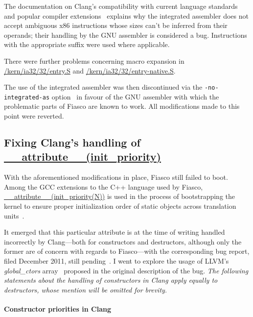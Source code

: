 The documentation on Clang's compatibility with current language standards and
popular compiler extensions~\cite[Inline assembly]{clang-compatibility}
explains why the integrated assembler does not accept ambiguous x86
instructions whose sizes can't be inferred from their operands; their handling
by the GNU assembler is considered a bug. Instructions with the appropriate
suffix were used where applicable.

There were further problems concerning macro expansion in
\url{/kern/ia32/32/entry.S} and \url{/kern/ia32/32/entry-native.S}.

The use of the integrated assembler was then discontinued via the
\texttt{-no-integrated-as} option~\cite{manclang} in favour of the GNU
assembler with which the problematic parts of Fiasco are known to work.
All modifications made to this point were reverted.

\subsection{Fixing Clang's handling of \url{\_\_attribute\_\_(init\_priority)}}

With the aforementioned modifications in place, Fiasco still failed to boot. Among the GCC extensions
to the C++ language used by Fiasco,
\url{\_\_attribute\_\_(init\_priority(N))} is used
in the process of bootstrapping the
kernel to ensure proper initialization order of static objects across
translation units~\cite{gcc-initpriority}.

It emerged
that this particular attribute is at the time of writing handled incorrectly by
Clang—both for constructors and destructors, although only the former are of concern with regards to Fiasco—with the corresponding
bug report, filed December 2011, still pending~\cite{initpriority-bug}. I went
to explore the usage of LLVM's \emph{global\_ctors}
array~\cite{langref-globalctors} proposed in the original description of the
bug. \emph{The following statements about the handling of
constructors in Clang apply equally to destructors, whose mention will be
omitted for brevity.}


\paragraph{Constructor priorities in Clang}


